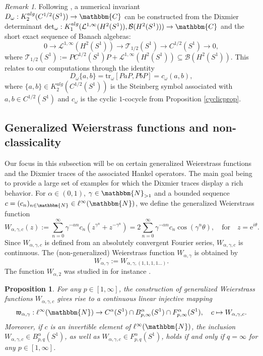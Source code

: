 \documentclass[10pt]{amsart}
\newtheorem{prop}[thm]{Proposition}
\theoremstyle{remark}
\newtheorem{remark}[thm]{Remark}
\theoremstyle{definition}
\begin{document}
\begin{remark}
\label{ktwosection}
Following \cite{kaadcomparison}, a numerical invariant $D_\omega:K_2^{alg}(C^{1/2}(S^1))\to {\mathbbm{C}}$ can be constructed from the Dixmier determinant $\det_\omega:K_1^{alg}(\mathcal{L}^{1,\infty}(H^2(S^1)),{\mathcal{B}}(H^2(S^1)))\to {\mathbbm{C}}$ and the short exact sequence of Banach algebras:
\begin{equation}
\label{theoninfseq}
0\to \mathcal{L}^{1,\infty}(H^2(S^1))\to \mathcal{T}_{1/2}(S^1)\to C^{1/2}(S^1)\to 0,
\end{equation}
where $\mathcal{T}_{1/2}(S^1):=PC^{1/2}(S^1)P+\mathcal{L}^{1,\infty}(H^2(S^1))\subseteq {\mathcal{B}}(H^2(S^1))$. This relates to our computations through the identity
$$D_\omega\{a,b\}={\mathrm{t}\mathrm{r}}_\omega[PaP,PbP]=c_\omega(a,b),$$
where $\{a,b\}\in K_2^{alg}(C^{1/2}(S^1))$ is the Steinberg symbol associated with $a,b\in C^{1/2}(S^1)$ and $c_\omega$ is the cyclic $1$-cocycle from Proposition \ref{cyclicprop}.
\end{remark}

\subsection{Generalized Weierstrass functions and non-classicality}
\label{weiersection}

Our focus in this subsection will be on certain generalized Weierstrass functions and the Dixmier traces of the associated Hankel operators. The main goal being to provide a large set of examples for which the Dixmier traces display a rich behavior. For $\alpha\in (0,1)$, $\gamma\in {\mathbbm{N}}_{>1}$ and a bounded sequence $c=(c_n)_{n\in {\mathbbm{N}}}\in \ell^\infty({\mathbbm{N}})$, we define the generalized Weierstrass function
\begin{equation}
\label{otherweinot}
W_{\alpha,\gamma,c}(z):=\sum_{n=0}^\infty \gamma^{-\alpha n} c_n(z^{\gamma^n}+z^{-\gamma^n})=2\sum_{n=0}^\infty \gamma^{-\alpha n}c_n\cos(\gamma^n \theta), \quad\mbox{for}\quad z={\mathrm{e}}^{i\theta}.
\end{equation}
Since $W_{\alpha,\gamma,c}$ is defined from an absolutely convergent Fourier series, $W_{\alpha,\gamma,c}$ is continuous. The (non-generalized) Weierstrass function $W_{\alpha,\gamma}$ is obtained by
$$W_{\alpha,\gamma}:=W_{\alpha,\gamma,(1,1,1,1\ldots)}.$$
The function $W_{\alpha,2}$ was studied in for instance \cite[Chapter II]{zygbook}.

\begin{prop}
\label{weierprop}
For any $p\in [1,\infty]$, the construction of generalized Weierstrass functions $W_{\alpha,\gamma,c}$ gives rise to a continuous linear injective mapping
$$\mathfrak{w}_{\alpha,\gamma}:\ell^\infty({\mathbbm{N}})\to C^\alpha(S^1)\cap B^\alpha_{p,\infty}(S^1)\cap F^\alpha_{p,\infty}(S^1), \quad c\mapsto W_{\alpha,\gamma,c}.$$
Moreover, if $c$ is an invertible element of $\ell^\infty({\mathbbm{N}})$, the inclusion $W_{\alpha,\gamma,c}\in B^\alpha_{p,q}(S^1)$, as well as $W_{\alpha,\gamma,c}\in F^\alpha_{p,q}(S^1)$, holds if and only if $q=\infty$ for any $p\in[1,\infty]$.
\end{prop}
\end{document}
